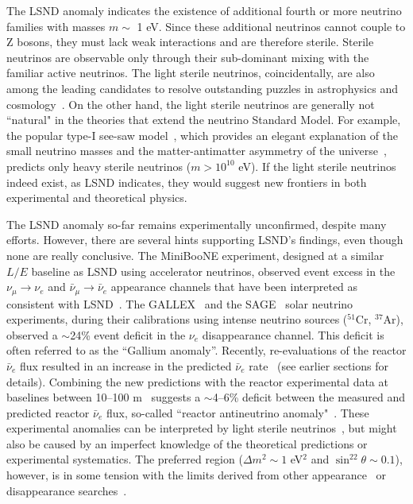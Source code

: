 \documentclass[aps,twocolumn,preprintnumbers,amsmath,superscriptaddress,amssymb,floats,nofootinbib]{revtex4-1}
\begin{document}
The LSND anomaly indicates the existence of additional fourth or more neutrino families with masses $m \sim$ 1 eV.
Since these additional neutrinos cannot couple to Z bosons, they must lack weak interactions and are therefore sterile.
Sterile neutrinos are observable only through their sub-dominant mixing with the familiar active neutrinos.
The light sterile neutrinos, coincidentally, are also among the leading candidates to resolve outstanding puzzles in astrophysics and
cosmology~\cite{Dodelson,Kusenko,Wyman,Battye}.
On the other hand, the light sterile neutrinos are generally not ``natural" in the theories that extend the neutrino Standard Model.
For example, the popular type-I see-saw model~\cite{Minkowski,Yanagida,GellMann,Mohapatra},
which provides an elegant explanation of the small neutrino masses and the matter-antimatter asymmetry of the universe~\cite{Fukugita}, predicts only heavy sterile neutrinos ($m >10^{10}$ eV).
If the light sterile neutrinos indeed exist, as LSND indicates, they would suggest new frontiers in both experimental and theoretical physics.

The LSND anomaly so-far remains experimentally unconfirmed, despite many efforts.
However, there are several hints supporting LSND's findings, even though none are really conclusive.
The MiniBooNE experiment, designed at a similar $L/E$ baseline as LSND using accelerator neutrinos, observed event excess
in the $\nu_{\mu}\rightarrow\nu_e$ and $\bar\nu_{\mu}\rightarrow\bar\nu_e$ appearance channels that have been interpreted as consistent with LSND~\cite{MiniBooNE2007,MiniBooNE2013}.
The GALLEX~\cite{GALLEX2010} and the SAGE~\cite{SAGE2009} solar neutrino experiments, during their calibrations using intense neutrino sources ($^{51}$Cr, $^{37}$Ar), observed a $\sim$24\% event deficit in the $\nu_e$ disappearance channel.
This deficit is often referred to as the ``Gallium anomaly''.
Recently, re-evaluations of the reactor $\bar\nu_e$ flux resulted in an increase in the predicted $\bar\nu_e$ rate~\cite{Mueller, Huber} (see earlier sections for details).
Combining the new predictions with the reactor experimental data at baselines between 10--100 m~\cite{ILL,Gosgen,Rovno,Krasnoyarsk,SRP,Bugey4,Bugey3} suggests a $\sim$4--6\% deficit between the measured and predicted reactor $\bar\nu_e$ flux, so-called
``reactor antineutrino anomaly"~\cite{Mention,Zhang13}.
These experimental anomalies can be interpreted by light sterile neutrinos~\cite{Guinti2011},
but might also be caused by an imperfect knowledge of the theoretical predictions or experimental systematics.
The preferred region ($\Delta{m}^2\sim1$ eV$^2$ and $\sin^22\theta\sim0.1$), however, is in some tension with the limits derived from other appearance~\cite{KARMEN2002,NOMAD03,OPERA13,ICARUS13} or disappearance searches~\cite{Stockdale84,Dydak84,MiniBooNE12-nubar,MiniBooNE12-nu,SuperK2000,MINOS11-NC,Bugey3,Conrad12,DayaBaySterile}.
\end{document}
